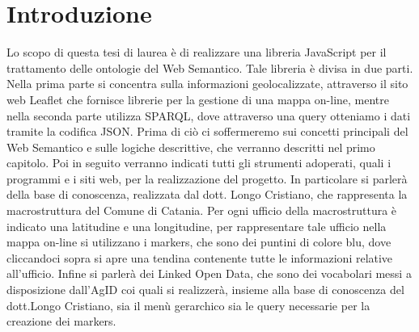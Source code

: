 \documentclass[a4paper,11pt]{article}
\begin{document}
\section{Introduzione}
Lo scopo di questa tesi di laurea è di realizzare una libreria JavaScript per il trattamento delle ontologie del Web Semantico.
Tale libreria è divisa in due parti. Nella prima parte si concentra sulla informazioni geolocalizzate, attraverso il sito web Leaflet che fornisce librerie per la gestione di una mappa on-line, mentre nella seconda parte utilizza SPARQL, dove attraverso una query otteniamo i dati tramite la codifica JSON. Prima di ciò ci soffermeremo sui concetti principali del Web Semantico e sulle logiche descrittive, che verranno descritti nel primo capitolo. Poi in seguito verranno indicati tutti gli strumenti adoperati, quali i programmi e i siti web, per la realizzazione del progetto. \newline In particolare si parlerà della base di conoscenza, realizzata dal dott. Longo Cristiano, che rappresenta la macrostruttura del Comune di Catania. Per ogni ufficio della macrostruttura è indicato una latitudine e una longitudine, per rappresentare tale ufficio nella mappa on-line si utilizzano i markers, che sono dei puntini di colore blu, dove cliccandoci sopra si apre una tendina contenente tutte le informazioni relative all'ufficio. 
Infine si parlerà dei Linked Open Data, che sono dei vocabolari messi a disposizione dall'AgID coi quali si realizzerà, insieme alla base di conoscenza del dott.Longo Cristiano, sia il menù gerarchico sia le query necessarie per la creazione dei markers.  



\newpage
\end{document}
